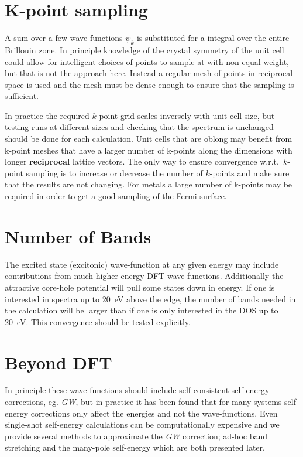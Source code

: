 \documentclass[11pt]{report}
\begin{document}
\section{K-point sampling}

A sum over a few wave functions $\psi_k$ is substituted for a integral over the entire Brillouin zone. In principle knowledge of the crystal symmetry of the unit cell could allow for intelligent choices of  points to sample at with non-equal weight, but that is not the approach here. Instead a regular mesh of points in reciprocal space is used and the mesh must be dense enough to ensure that the sampling is sufficient. 

In practice the required $k$-point grid scales inversely with unit cell size, but testing runs at different sizes and checking that the spectrum is unchanged should be done for each calculation. Unit cells that are oblong may benefit from k-point meshes that have a larger number of k-points along the dimensions with longer {\bf reciprocal} lattice vectors. The only way to ensure convergence w.r.t.\ $k$-point sampling is to increase or decrease the number of $k$-points and make sure that the results are not changing. For metals a large number of k-points may be required in order to get a good sampling of the Fermi surface.

\section{Number of Bands}

The excited state (excitonic) wave-function at any given energy may include contributions from much higher energy DFT wave-functions. Additionally the attractive core-hole potential will pull some states down in energy. If one is interested in spectra up to 20~eV above the edge, the number of bands needed in the calculation will be larger than if one is only interested in the DOS up to 20~eV. This convergence should be tested explicitly. 

\section{Beyond DFT}

In principle these wave-functions should include self-consistent self-energy corrections, eg. {\it GW}, 
but in practice it has been found that for many systems 
self-energy corrections only affect the energies and not the wave-functions. 
Even single-shot self-energy calculations can be computationally expensive 
and we provide several methods to approximate the {\it GW} correction; 
ad-hoc band stretching and the many-pole self-energy which are both presented later.
\end{document}
